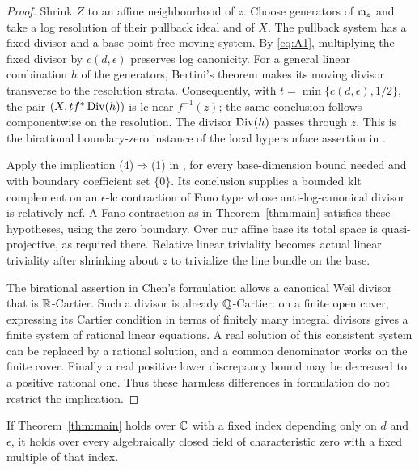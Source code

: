 \begin{proof}
Shrink $Z$ to an affine neighbourhood of $z$. Choose generators of $\mathfrak m_z$
and take a log resolution of their pullback ideal and of $X$. The pullback
system has a fixed divisor and a base-point-free moving system. By
\eqref{eq:A1}, multiplying the fixed divisor by $c(d,\epsilon)$ preserves
log canonicity. For a general linear combination $h$ of the generators,
Bertini's theorem makes its moving divisor transverse to the resolution
strata. Consequently, with
$t=\min\{c(d,\epsilon),1/2\}$, the pair
$(X,t f^*\operatorname{Div}(h))$ is lc near $f^{-1}(z)$; the same conclusion follows
componentwise on the resolution. The divisor $\operatorname{Div}(h)$ passes through $z$.
This is the birational boundary-zero instance of the local hypersurface
assertion in \cite[Conjecture~1.3]{Chen}.

Apply the implication (4)$\Rightarrow$(1) in
\cite[Theorem~1.6]{Chen}, for every base-dimension bound needed and with
boundary coefficient set $\{0\}$. Its conclusion supplies a bounded klt
complement on an $\epsilon$-lc contraction of Fano type whose
anti-log-canonical divisor is relatively nef. A Fano contraction as in
Theorem~\ref{thm:main} satisfies these hypotheses, using the zero boundary.
Over our affine base its total space is quasi-projective, as required there.
Relative linear triviality becomes actual linear triviality after shrinking
about $z$ to trivialize the line bundle on the base.

The birational assertion in Chen's formulation allows a canonical Weil
divisor that is $\mathbb R$-Cartier. Such a divisor is already $\mathbb Q$-Cartier: on a
finite open cover, expressing its Cartier condition in terms of finitely many
integral divisors gives a finite system of rational linear equations. A real
solution of this consistent system can be replaced by a rational solution,
and a common denominator works on the finite cover. Finally a real positive
lower discrepancy bound may be decreased to a positive rational one. Thus
these harmless differences in formulation do not restrict the implication.
\end{proof}

\begin{lemma}\label{lem:field-descent}
If Theorem~\ref{thm:main} holds over $\mathbb C$ with a fixed index depending only
on $d$ and $\epsilon$, it holds over every algebraically closed field of
characteristic zero with a fixed multiple of that index.
\end{lemma}


